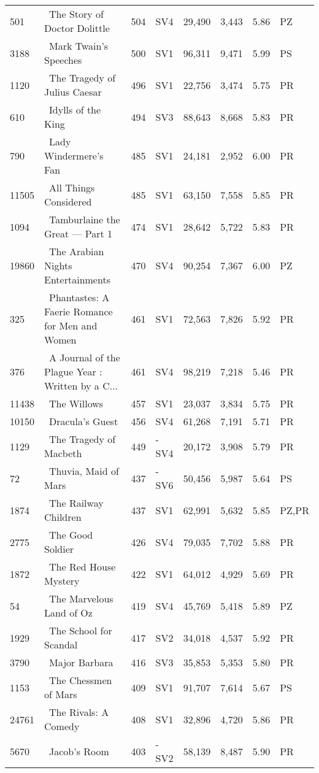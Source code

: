 \begin{longtable}{l | l | l | l | l | l | l | l}
501 & ~The Story of Doctor Dolittle & 504 & SV4 & 29,490 & 3,443 & 5.86 & PZ\\
3188 & ~Mark Twain's Speeches & 500 & SV1 & 96,311 & 9,471 & 5.99 & PS\\
1120 & ~The Tragedy of Julius Caesar & 496 & SV1 & 22,756 & 3,474 & 5.75 & PR\\
610 & ~Idylls of the King & 494 & SV3 & 88,643 & 8,668 & 5.83 & PR\\
790 & ~Lady Windermere's Fan & 485 & SV1 & 24,181 & 2,952 & 6.00 & PR\\
11505 & ~All Things Considered & 485 & SV1 & 63,150 & 7,558 & 5.85 & PR\\
1094 & ~Tamburlaine the Great — Part 1 & 474 & SV1 & 28,642 & 5,722 & 5.83 & PR\\
19860 & ~The Arabian Nights Entertainments & 470 & SV4 & 90,254 & 7,367 & 6.00 & PZ\\
325 & ~Phantastes: A Faerie Romance for Men and Women & 461 & SV1 & 72,563 & 7,826 & 5.92 & PR\\
376 & ~A Journal of the Plague Year
: Written by a C... & 461 & SV4 & 98,219 & 7,218 & 5.46 & PR\\
11438 & ~The Willows & 457 & SV1 & 23,037 & 3,834 & 5.75 & PR\\
10150 & ~Dracula's Guest & 456 & SV4 & 61,268 & 7,191 & 5.71 & PR\\
1129 & ~The Tragedy of Macbeth & 449 & -SV4 & 20,172 & 3,908 & 5.79 & PR\\
72 & ~Thuvia, Maid of Mars & 437 & -SV6 & 50,456 & 5,987 & 5.64 & PS\\
1874 & ~The Railway Children & 437 & SV1 & 62,991 & 5,632 & 5.85 & PZ,PR\\
2775 & ~The Good Soldier & 426 & SV4 & 79,035 & 7,702 & 5.88 & PR\\
1872 & ~The Red House Mystery & 422 & SV1 & 64,012 & 4,929 & 5.69 & PR\\
54 & ~The Marvelous Land of Oz & 419 & SV4 & 45,769 & 5,418 & 5.89 & PZ\\
1929 & ~The School for Scandal & 417 & SV2 & 34,018 & 4,537 & 5.92 & PR\\
3790 & ~Major Barbara & 416 & SV3 & 35,853 & 5,353 & 5.80 & PR\\
1153 & ~The Chessmen of Mars & 409 & SV1 & 91,707 & 7,614 & 5.67 & PS\\
24761 & ~The Rivals: A Comedy & 408 & SV1 & 32,896 & 4,720 & 5.86 & PR\\
5670 & ~Jacob's Room & 403 & -SV2 & 58,139 & 8,487 & 5.90 & PR\\

\end{longtable}
